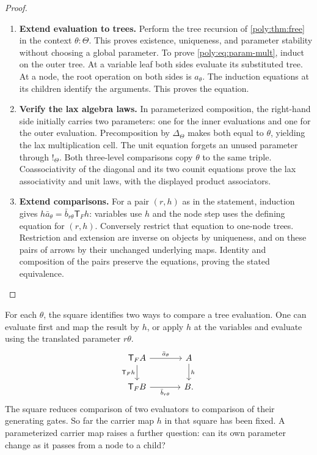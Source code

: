 \documentclass[11pt,a4paper]{article}
\theoremstyle{definition}
\theoremstyle{remark}\newaliascnt{remark}{theorem}
\numberwithin{equation}{section}
\begin{document}
\begin{proof}\leavevmode
\begin{enumerate}[titledsteps]
    \item \textbf{Extend evaluation to trees.} Perform the tree recursion of \cref{poly:thm:free} in the context
$\theta:\Theta$. This proves existence, uniqueness, and parameter
stability without choosing a global parameter. To prove
\eqref{poly:eq:param-mult}, induct on the outer tree. At a variable
leaf both sides evaluate its substituted tree. At a node, the root
operation on both sides is $a_\theta$. The induction equations at
its children identify the arguments. This proves the equation.


    \item \textbf{Verify the lax algebra laws.} In parameterized composition, the right-hand side initially carries
two parameters: one for the inner evaluations and one for the outer
evaluation. Precomposition by $\Delta_\Theta$ makes both equal to
$\theta$, yielding the lax multiplication cell. The unit equation
forgets an unused parameter through $!_\Theta$. Both three-level
comparisons copy $\theta$ to the same triple. Coassociativity of the
diagonal and its two counit equations prove the lax associativity and
unit laws, with the displayed product associators.


    \item \textbf{Extend comparisons.} For a pair $(r,h)$ as in the statement, induction gives
$h\bar a_\theta=\bar b_{r\theta}\mathsf T_Fh$: variables use $h$
and the node step uses the defining equation for $(r,h)$. Conversely
restrict that equation to one-node trees. Restriction and extension
are inverse on objects by uniqueness, and on these pairs of arrows
by their unchanged underlying maps. Identity and composition of the
pairs preserve the equations, proving the stated equivalence.\qedhere
\end{enumerate}
\end{proof}
For each $\theta$, the square identifies two ways to compare a tree evaluation. One can evaluate first and map the result by $h$, or apply $h$ at the variables and evaluate using the translated parameter $r\theta$.
\[
\begin{tikzcd}[column sep=large]
 \mathsf T_F A\arrow[r,"\bar a_\theta"]\arrow[d,"\mathsf T_F h"']&
 A\arrow[d,"h"]\\
 \mathsf T_F B\arrow[r,"\bar b_{r\theta}"']&B .
\end{tikzcd}
\]
The square reduces comparison of two evaluators to comparison of their generating gates. So far the carrier map $h$ in that square has been fixed. A parameterized carrier map raises a further question: can its own parameter change as it passes from a node to a child?
\end{document}
